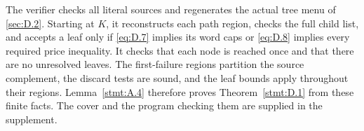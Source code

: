 \documentclass[11pt,a4paper]{article}
\begin{document}
The verifier checks all literal sources and regenerates the actual tree menu of \ref{sec:D.2}. Starting at \(K\), it reconstructs each path region, checks the full child list, and accepts a leaf only if \eqref{eq:D.7} implies its word caps or \eqref{eq:D.8} implies every required price inequality. It checks that each node is reached once and that there are no unresolved leaves. The first-failure regions partition the source complement, the discard tests are sound, and the leaf bounds apply throughout their regions. Lemma~\ref{stmt:A.4} therefore proves Theorem~\ref{stmt:D.1} from these finite facts. The cover and the program checking them are supplied in the supplement.
\end{document}
